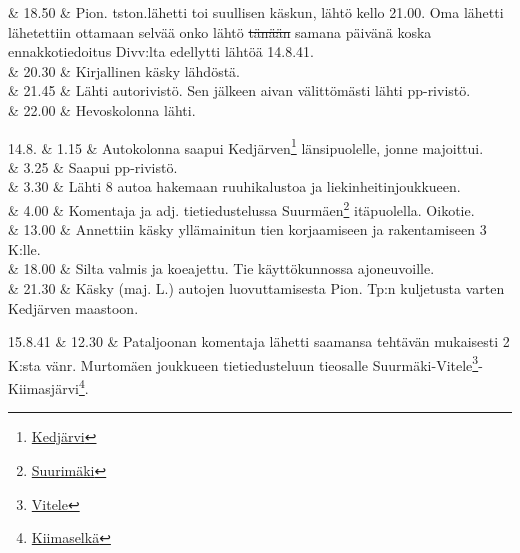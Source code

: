 \documentclass[11pt,a5paper,oneside]{book}
\begin{document}
& 18.50 & Pion. tston.lähetti toi suullisen käskun, lähtö kello 21.00. Oma lähetti lähetettiin ottamaan selvää onko lähtö \sout{tänään} samana päivänä koska ennakkotiedoitus Divv:lta edellytti lähtöä 14.8.41. \\

& 20.30 & Kirjallinen käsky lähdöstä. \\

& 21.45 & Lähti autorivistö. Sen jälkeen aivan välittömästi lähti pp-rivistö. \\

& 22.00 & Hevoskolonna lähti. \\

\taulustop


14.8. & 1.15 & Autokolonna saapui Kedjärven\footnote{\href{https://www.google.fi/maps/place/Ozero+Ked\%22Yarvi/@61.347179,32.4440471,15.26z/}{Kedjärvi}} länsipuolelle, jonne majoittui. \\

& 3.25 & Saapui pp-rivistö. \\

& 3.30 & Lähti 8 autoa hakemaan ruuhikalustoa ja liekinheitinjoukkueen. \\

& 4.00 & Komentaja ja adj. tietiedustelussa Suurmäen\footnote{\href{https://www.google.fi/maps/place/Bol'shiye+Gory,+Republic+of+Karelia,+Russia/}{Suurimäki}} itäpuolella. Oikotie. \newline \\

& 13.00 & Annettiin käsky yllämainitun tien korjaamiseen ja rakentamiseen 3 K:lle. \newline \\

& 18.00 & Silta valmis ja koeajettu. \newline Tie käyttökunnossa ajoneuvoille. \newline\newline \\

& 21.30 & Käsky (maj. L.) autojen luovuttamisesta Pion. Tp:n kuljetusta varten Kedjärven maastoon. \\
\newpage

15.8.41 & 12.30 & Pataljoonan komentaja lähetti saamansa tehtävän mukaisesti 2 K:sta vänr. Murtomäen joukkueen tietiedusteluun tieosalle Suurmäki-Vitele\footnote{\href{https://www.google.fi/maps/place/Vidlitsa,+Republic+of+Karelia,+Russia,+186007/}{Vitele}}-Kiimasjärvi\footnote{\href{https://www.google.fi/maps/place/Kimusel'gskoye/@61.200226,32.7254117,16z/}{Kiimaselkä}}. \\
\end{document}
